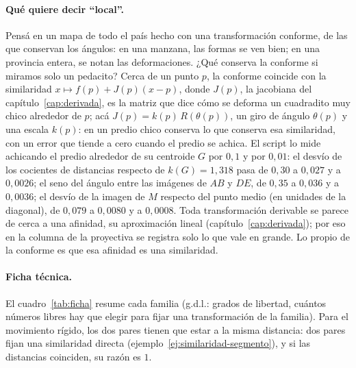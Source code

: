 \paragraph{Qué quiere decir \enquote{local}.} Pensá en un mapa de todo el país hecho con una
transformación conforme, de las que conservan los ángulos: en una manzana, las formas se ven
bien; en una provincia entera, se notan las deformaciones. ¿Qué
conserva la conforme si miramos solo un pedacito? Cerca de un punto \(p\), la conforme coincide
con la similaridad \(x\mapsto f(p)+J(p)(x-p)\), donde \(J(p)\), la jacobiana del
capítulo~\ref{cap:derivada}, es la matriz que dice cómo se deforma un cuadradito muy chico
alrededor de \(p\); acá \(J(p)=k(p)\,R(\theta(p))\), un giro de ángulo \(\theta(p)\) y una escala
\(k(p)\): en un predio chico
conserva lo que conserva esa similaridad, con un error que tiende a cero cuando el predio se
achica. El script lo mide achicando el predio alrededor de su centroide \(G\) por \(0{,}1\) y
por \(0{,}01\): el desvío de los cocientes de distancias respecto de \(k(G)=1{,}318\) pasa de
\(0{,}30\) a \(0{,}027\) y a \(0{,}0026\); el seno del ángulo entre las imágenes de \(AB\) y
\(DE\), de \(0{,}35\) a \(0{,}036\) y a \(0{,}0036\); el desvío de la imagen de \(M\) respecto del
punto medio (en unidades de la diagonal), de \(0{,}079\) a \(0{,}0080\) y a \(0{,}0008\). Toda
transformación derivable se parece de cerca a una afinidad, su aproximación lineal
(capítulo~\ref{cap:derivada}); por eso en la columna de la proyectiva se registra solo lo que
vale en grande. Lo propio de la conforme es que esa afinidad es una similaridad.

\paragraph{Ficha técnica.} El cuadro~\ref{tab:ficha} resume cada familia (g.d.l.: grados de
libertad, cuántos números libres hay que elegir para fijar una transformación de la familia). Para el movimiento rígido, los dos pares tienen
que estar a la misma distancia: dos pares fijan una similaridad directa
(ejemplo~\ref{ej:similaridad-segmento}), y si las distancias coinciden, su razón es \(1\).

